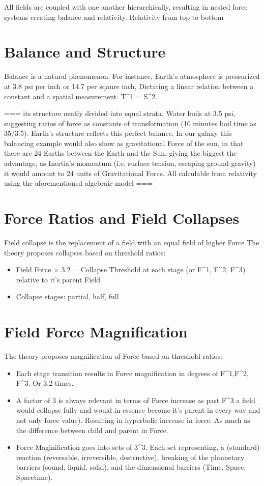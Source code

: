 \documentclass[12pt]{thesis}
\begin{document}
All fields are coupled with one another hierarchically, resulting in nested force systems creating balance and relativity. Relativity from top to bottom

\section{Balance and Structure}
Balance is a natural phenomenon. For instance, Earth’s atmosphere is pressurized at 3.8 psi per inch or 14.7 per sqaure inch, 
Dictating a linear relation between a constant and a spatial measurement. T^1 = S^2.

===
its structure neatly divided into equal strata. Water boils at 3.5 psi, suggesting ratios of force as constants of transformation (10 minutes boil time as 35/3.5). Earth’s structure reflects this perfect balance. In our galaxy this balancing example would also show as gravitational Force of the sun, in that there are 24 Earths between the Earth and the Sun, giving the biggest the advantage, as Inertia's momentum (i.e. surface tension, escaping ground gravity) it would amount to 24 units of Gravitational Force. All calculable from relativity using the aforementioned algebraic model
===

\section{Force Ratios and Field Collapses}
Field collapse is the replacement of a field with an equal field of higher Force
The theory proposes collapses based on threshold ratios:
\begin{itemize}
    \item Field Force $\times$ 3.2 = Collapse Threshold at each stage (or F^1, F^2, F^3) relative to it's parent Field
    \item Collapse stages: partial, half, full
\end{itemize}

\section{Field Force Magnification}
The theory proposes magnification of Force based on threshold ratios:
\begin{itemize}
    \item Each stage transition results in Force magnification in degrees of F^1,F^2, F^3. Or 3.2 times.
    \item A factor of 3 is always relevant in terms of Force increase as past F^3 a field would collapse fully and would in essence become it's parent in every way and not only force value). Resulting in hyperbolic increase in force. As much as the difference between child and parent in Force. 
    \item Force Maginification goes into sets of 3^3. Each set representing, a (standard) reaction (reversable, irreversible, destructive), breaking of the plannetary barriers (sound, liquid, solid), and the dimensional barriers (Time, Space, Spacetime).
\end{itemize}
\end{document}
